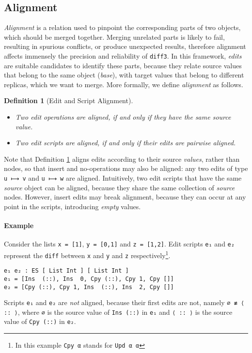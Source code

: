 \documentclass{sigplanconf}
\theoremstyle{plain}
\newtheorem{definition}{Definition}
\begin{document}
\subsection{Alignment}
\label{subsec:alignment}
%
\emph{Alignment} is a relation used to pinpoint the corresponding
parts of two objects, which should be merged together.
%
Merging unrelated parts is likely to fail, resulting in spurious
conflicts, or produce unexpected results, therefore alignment affects
immensely the precision and reliability of \texttt{diff3}.
%
In this framework, \emph{edits} are suitable candidates to identify
these parts, because they relate source values that belong to the same
object (\emph{base}), with target values that belong to different
replicas, which we want to merge.
%
More formally, we define \emph{alignment} as follows.
\begin{definition}[Edit and Script Alignment]
\mbox{}
\label{def:align}
\begin{itemize}
  \item Two edit operations are aligned, if and only if they have the same source value.
  \item Two edit scripts are aligned, if and only if their edits are
    pairwise aligned.
\end{itemize}
\end{definition}
Note that Definition \ref{def:align} aligns edits according to their
source \emph{values}, rather than nodes, so that insert and
no-operations may also be aligned: any two edits of type \texttt{u ⟼
  v} and \texttt{u ⟼ w} are aligned.
%	
Intuitively, two edit scripts that have the same \emph{source} object
can be aligned, because they share the same collection of
\emph{source} nodes.
%
However, insert edits may break alignment, because they can occur at
any point in the scripts, introducing \emph{empty} values.

\paragraph{Example}
Consider the lists \texttt{x = [1]}, \texttt{y = [0,1]} and \texttt{z
  = [1,2]}.
%
Edit scripts \texttt{e₁} and \texttt{e₂} represent the \texttt{diff}
between \texttt{x} and \texttt{y} and \texttt{z}
respectively\footnote{In this example \texttt{Cpy α} stands for \texttt{Upd α α}}.
\begin{verbatim}
e₁ e₂ : ES [ List Int ] [ List Int ]
e₁ = [Ins  (::), Ins  0, Cpy (::), Cpy 1, Cpy []]
e₂ = [Cpy (::), Cpy 1, Ins  (::), Ins  2, Cpy []] 
\end{verbatim}       
%
Scripts \texttt{e₁} and \texttt{e₂} are \emph{not} aligned, because
their first edits are not, namely \texttt{∅ ≢ ⟨ :: ⟩}, where
\texttt{∅} is the source value of \texttt{Ins (::)} in \texttt{e₁} and
\texttt{⟨ :: ⟩} is the source value of \texttt{Cpy (::)} in
\texttt{e₂}.
\end{document}
